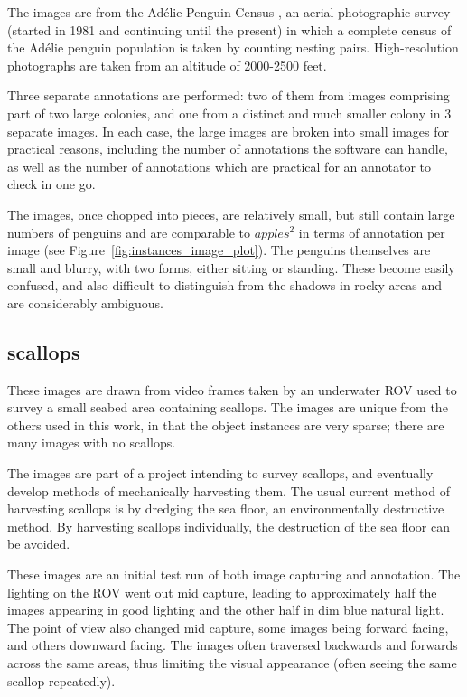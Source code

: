 The images are from the Ad\'elie Penguin Census \cite{Lyver2014}, an aerial photographic survey (started in 1981 and continuing until the present) in which a complete census of the Ad\'elie penguin population is taken by counting nesting pairs. High-resolution photographs are taken from an altitude of 2000-2500 feet.

Three separate annotations are performed: two of them from images comprising part of two large colonies, and one from a distinct and much smaller colony in 3 separate images. In each case, the large images are broken into small images for practical reasons, including the number of annotations the software can handle, as well as the number of annotations which are  practical for an annotator to check in one go.
    
The images, once chopped into pieces, are relatively small, but still contain large numbers of penguins and are comparable to $apples^2$ in terms of annotation per image (see Figure~\ref{fig:instances_image_plot}). The penguins themselves are small and blurry, with two forms, either sitting or standing. These become  easily confused, and also difficult to distinguish from the shadows in rocky areas and are considerably ambiguous. 

\subsection{scallops}
    
These images are drawn from video frames taken by an underwater \gls{ROV} used to survey a small seabed area containing scallops. The images are unique from the others used in this work, in that the object instances are very sparse; there are many images with no scallops. 

The images are part of a project intending to survey scallops, and eventually develop methods of mechanically harvesting them. The usual current method of harvesting scallops is by dredging the sea floor, an environmentally destructive method. By harvesting scallops individually, the destruction of the sea floor can be avoided.

These images are an initial test run of both image capturing and annotation. The lighting on the \gls{ROV} went out mid capture, leading to approximately half the images appearing in good lighting and the other half in dim blue natural light. The point of view also changed mid capture, some images being forward facing, and others downward facing. The images often traversed backwards and forwards across the same areas, thus limiting the visual appearance (often seeing the same scallop repeatedly). 

